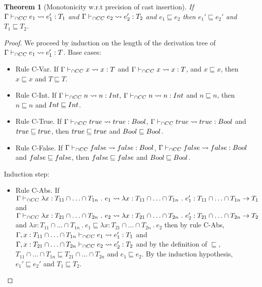 \documentclass[a4paper]{article}
\newtheorem{theorem}{Theorem}
\begin{document}
\begin{theorem}[Monotonicity w.r.t precision of cast insertion]
\label{monotonicity_wrt_precision_cast_insertion}
If $\Gamma \vdash_{\cap CC} e_1 \leadsto e_1' : T_1$ and $\Gamma \vdash_{\cap CC} e_2 \leadsto e_2' : T_2$ and $e_1 \sqsubseteq e_2$ then $e_1' \sqsubseteq e_2'$ and $T_1 \sqsubseteq T_2$.
\end{theorem}
\begin{proof}
We proceed by induction on the length of the derivation tree of $\Gamma \vdash_{\cap CC} e_1 \leadsto e_1' : T$.
Base cases:
\begin{itemize}
    \item Rule C-Var.
    If $\Gamma \vdash_{\cap CC} x \leadsto x : T$ and $\Gamma \vdash_{\cap CC} x \leadsto x : T$, and $x \sqsubseteq x$, then $x \sqsubseteq x$ and $T \sqsubseteq T$.
    \item Rule C-Int.
    If $\Gamma \vdash_{\cap CC} n \leadsto n : {Int}$, $\Gamma \vdash_{\cap CC} n \leadsto n : {Int}$ and $n \sqsubseteq n$, then $n \sqsubseteq n$ and ${Int} \sqsubseteq {\ensuremath{Int}}$.
    \item Rule C-True.
    If $\Gamma \vdash_{\cap CC} true \leadsto true : Bool$, $\Gamma \vdash_{\cap CC} true \leadsto true : Bool$ and $true \sqsubseteq true$, then $true \sqsubseteq true$ and $Bool \sqsubseteq Bool$.
    \item Rule C-False.
    If $\Gamma \vdash_{\cap CC} false \leadsto false : Bool$, $\Gamma \vdash_{\cap CC} false \leadsto false : Bool$ and $false \sqsubseteq false$, then $false \sqsubseteq false$ and $Bool \sqsubseteq Bool$.
\end{itemize}
Induction step:
\begin{itemize}
    \item Rule C-Abs.
    If $\Gamma \vdash_{\cap CC} \lambda x : T_{11} \cap \ldots \cap T_{1n}\ .\ e_1 \leadsto \lambda x : T_{11} \cap \ldots \cap T_{1n}\ .\ e_1' : T_{11} \cap \ldots \cap T_{1n} \rightarrow T_1$ and $\Gamma \vdash_{\cap CC} \lambda x : T_{21} \cap \ldots \cap T_{2n}\ .\ e_2 \leadsto \lambda x : T_{21} \cap \ldots \cap T_{2n}\ .\ e_2' : T_{21} \cap \ldots \cap T_{2n} \rightarrow T_2$ and $\lambda x : T_{11} \cap \ldots \cap T_{1n}\ .\ e_1 \sqsubseteq \lambda x : T_{21} \cap \ldots \cap T_{2n}\ .\ e_2$ then by rule C-Abs, $\Gamma, x : T_{11} \cap \ldots \cap T_{1n} \vdash_{\cap CC} e_1 \leadsto e_1': T_1$ and $\Gamma, x : T_{21} \cap \ldots \cap T_{2n} \vdash_{\cap CC} e_2 \leadsto e_2': T_2$ and by the definition of $\sqsubseteq$, $T_{11} \cap \ldots \cap T_{1n} \sqsubseteq T_{21} \cap \ldots \cap T_{2n}$ and $e_1 \sqsubseteq e_2$.
    By the induction hypothesis, $e_1' \sqsubseteq e_2'$ and $T_1 \sqsubseteq T_2$.

\end{itemize}
\end{proof}
\end{document}
